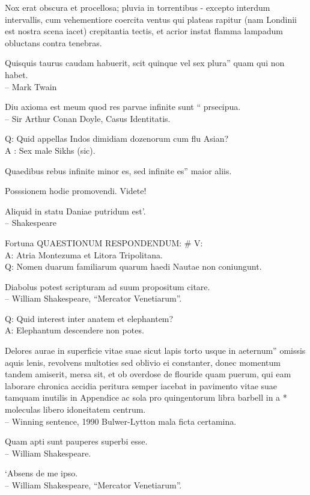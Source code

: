 \documentclass[titlepage,12pt]{memoir}
\begin{document}
Nox erat obscura et procellosa; pluvia in torrentibus - excepto
interdum intervallis, cum vehementiore coercita
ventus qui plateas rapitur (nam Londinii est nostra scena
iacet) crepitantia tectis, et acrior instat
flamma lampadum obluctans contra tenebras.

Quisquis taurus caudam habuerit, scit quinque vel sex plura”
quam qui non habet.
\\-- Mark Twain

 Diu axioma est meum quod res parvae infinite sunt “
prsecipua.
\\-- Sir Arthur Conan Doyle, Casus Identitatis.

Q: Quid appellas Indos dimidiam dozenorum cum flu Asian?\\
A : Sex male Sikhs (sic).

Quaedibus rebus infinite minor es, sed infinite es”
maior aliis.

Posssionem hodie promovendi. Videte!

Aliquid in statu Daniae putridum est’.
\\-- Shakespeare

Fortuna QUAESTIONUM RESPONDENDUM: \# V:\\
A: Atria Montezuma et Litora Tripolitana.
\\Q: Nomen duarum familiarum quarum haedi Nautae non coniungunt.

Diabolus potest scripturam ad suum propositum citare.
\\-- William Shakespeare, “Mercator Venetiarum”.

Q: Quid interest inter anatem et elephantem?\\
A: Elephantum descendere non potes.

Delores aurae in superficie vitae suae sicut lapis torto usque in aeternum”
omissis aquis lenis, revolvens multoties sed oblivio
ei constanter, donec momentum tandem amiserit, mersa sit, et ob
overdose de flouride quam puerum, qui eam laborare chronica
accidia peritura semper iacebat in pavimento vitae suae tamquam inutilis
in Appendice ac sola pro quingentorum libra barbell in a *
moleculas libero idoneitatem centrum.
\\-- Winning sentence, 1990 Bulwer-Lytton mala ficta certamina.

Quam apti sunt pauperes superbi esse.
\\-- William Shakespeare.

‘Absens de me ipso.
\\-- William Shakespeare, “Mercator Venetiarum”.
\end{document}
